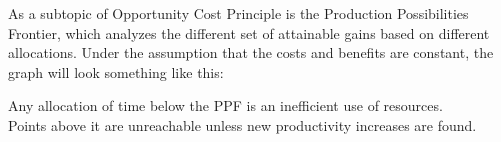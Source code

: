 \documentclass[nobib]{tufte-handout}
\begin{document}
As a subtopic of Opportunity Cost Principle is the Production Possibilities Frontier, which analyzes the different set of attainable gains based on different allocations. Under the assumption that the costs and benefits are constant, the graph will look something like this:
\begin{center}
\end{center}
Any allocation of time below the PPF is an inefficient use of resources.\\ Points above it are unreachable unless new productivity increases are found.\\
\end{document}
